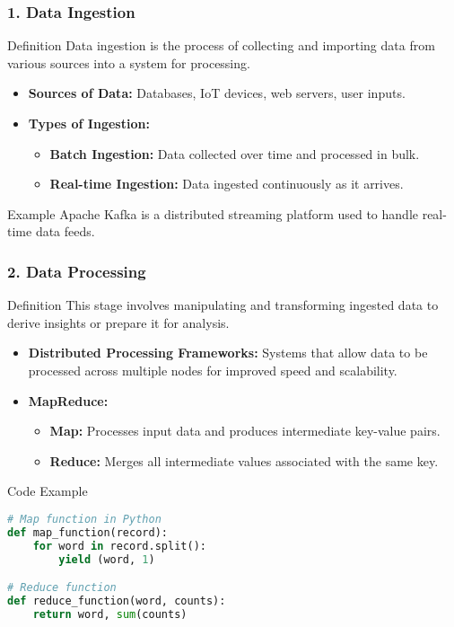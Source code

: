 \documentclass[aspectratio=169]{beamer}
\begin{document}
\begin{frame}
    \frametitle{1. Data Ingestion}
    \begin{block}{Definition}
        Data ingestion is the process of collecting and importing data from various sources into a system for processing.
    \end{block}
    \begin{itemize}
        \item \textbf{Sources of Data:} Databases, IoT devices, web servers, user inputs.
        \item \textbf{Types of Ingestion:}
            \begin{itemize}
                \item \textbf{Batch Ingestion:} Data collected over time and processed in bulk.
                \item \textbf{Real-time Ingestion:} Data ingested continuously as it arrives.
            \end{itemize}
    \end{itemize}
    \begin{block}{Example}
        Apache Kafka is a distributed streaming platform used to handle real-time data feeds.
    \end{block}
\end{frame}

\begin{frame}[fragile]
    \frametitle{2. Data Processing}
    \begin{block}{Definition}
        This stage involves manipulating and transforming ingested data to derive insights or prepare it for analysis.
    \end{block}
    \begin{itemize}
        \item \textbf{Distributed Processing Frameworks:} Systems that allow data to be processed across multiple nodes for improved speed and scalability.
        \item \textbf{MapReduce:} 
            \begin{itemize}
                \item \textbf{Map:} Processes input data and produces intermediate key-value pairs.
                \item \textbf{Reduce:} Merges all intermediate values associated with the same key.
            \end{itemize}
    \end{itemize}
    \begin{block}{Code Example}
    \begin{lstlisting}[language=Python]
# Map function in Python
def map_function(record):
    for word in record.split():
        yield (word, 1)

# Reduce function
def reduce_function(word, counts):
    return word, sum(counts)
    \end{lstlisting}
    \end{block}
\end{frame}
\end{document}
